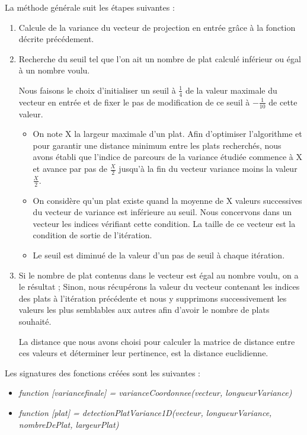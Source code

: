 La méthode générale suit les étapes suivantes : 
\begin{enumerate}
  \item Calcule de la variance du vecteur de projection en entrée grâce à la fonction décrite précédement. 
  \item Recherche du seuil tel que l'on ait un nombre de plat calculé inférieur ou égal à un nombre voulu. 

Nous faisons le choix d'initialiser un seuil à $\frac{1}{4}$ de la valeur maximale du vecteur en entrée 
et de fixer le pas de modification de ce seuil à $-\frac{1}{10}$ de cette valeur. 
\begin{itemize}
  \item On note X la largeur maximale d'un plat. 
Afin d'optimiser l'algorithme et pour garantir une distance minimum entre les plats recherchés, nous avons 
établi que l'indice de parcours de la variance étudiée commence à X et avance par pas de $\frac{X}{2}$ jusqu'à la fin du vecteur 
variance moins la valeur $\frac{X}{2}$. 
  \item On considère qu'un plat existe quand la moyenne de X valeurs successives du vecteur de variance est inférieure au seuil. 
Nous concervons dans un vecteur les indices vérifiant cette condition.
La taille de ce vecteur est la condition de sortie de l'itération.  
  \item Le seuil est diminué de la valeur d'un pas de seuil à chaque itération. 
\end{itemize}

  \item Si le nombre de plat contenus dans le vecteur est égal au nombre voulu, on a le résultat ; 
Sinon, nous récupérons la valeur du vecteur contenant les indices des plats à l'itération précédente et 
nous y supprimons successivement les valeurs les plus semblables aux autres afin d'avoir le nombre de plats souhaité. 

  La distance que nous avons choisi pour calculer la matrice de distance entre ces valeurs et déterminer leur pertinence,
est la distance euclidienne. 
\end{enumerate}

  Les signatures des fonctions créées sont les suivantes : 
\begin{itemize}
  \item \textit{function [variancefinale] = varianceCoordonnee(vecteur, longueurVariance)}
  \item \textit{function [plat] = detectionPlatVariance1D(vecteur, longueurVariance, nombreDePlat, largeurPlat)}
\end{itemize}

